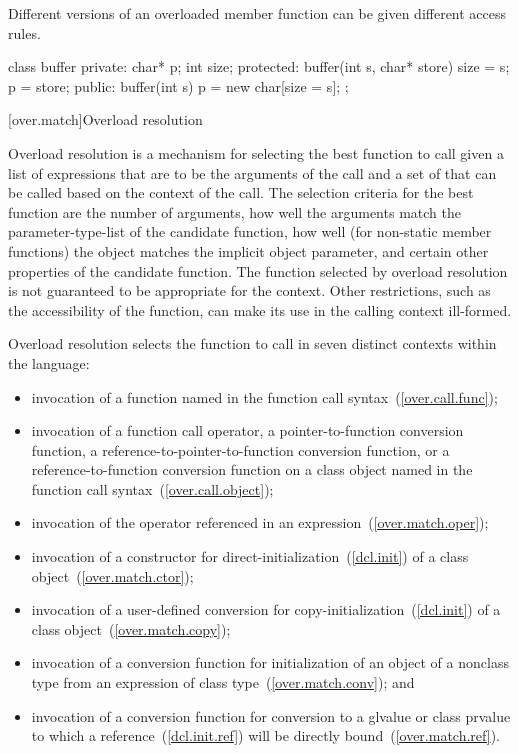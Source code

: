 \pnum
{}%
%
Different versions of an overloaded member function can be given different
access rules.
\enterexample

\begin{codeblock}
class buffer {
private:
    char* p;
    int size;
protected:
    buffer(int s, char* store) { size = s; p = store; }
public:
    buffer(int s) { p = new char[size = s]; }
};
\end{codeblock}
\exitexample

[over.match]{Overload resolution}%
%
%

\pnum
Overload resolution is a mechanism for selecting the best
function to call given a list of expressions that are to be the
arguments of the call and a set of
that can
be called based on the context of the call.
The selection
criteria for the best function are the number of arguments, how
well the arguments match the parameter-type-list of the
candidate function,
how well (for non-static member functions) the object
matches the implicit object parameter,
and certain other properties of the candidate function.
\enternote
The function selected by overload resolution is not
guaranteed to be appropriate for the context.
Other restrictions,
such as the accessibility of the function, can make its use in
the calling context ill-formed.
\exitnote

\pnum
{}%
Overload resolution selects the function to call in seven distinct
contexts within the language:

\begin{itemize}
\item
invocation of a function named in the function call syntax~(\ref{over.call.func});
\item
invocation of a function call operator, a pointer-to-function
conversion function, a reference-to-pointer-to-function conversion
function, or a reference-to-function
conversion function on a class object named in the function
call syntax~(\ref{over.call.object});
\item
invocation of the operator referenced in an expression~(\ref{over.match.oper});
\item
invocation of a constructor for direct-initialization~(\ref{dcl.init})
of a class object~(\ref{over.match.ctor});
\item
invocation of a user-defined conversion for
copy-initialization~(\ref{dcl.init}) of a class object~(\ref{over.match.copy});
\item
invocation of a conversion function for initialization of an object of a
nonclass type from an expression of class type~(\ref{over.match.conv}); and
\item
invocation of a conversion function for conversion to a glvalue
or class prvalue
to which a reference~(\ref{dcl.init.ref})
will be directly bound~(\ref{over.match.ref}).
\end{itemize}

